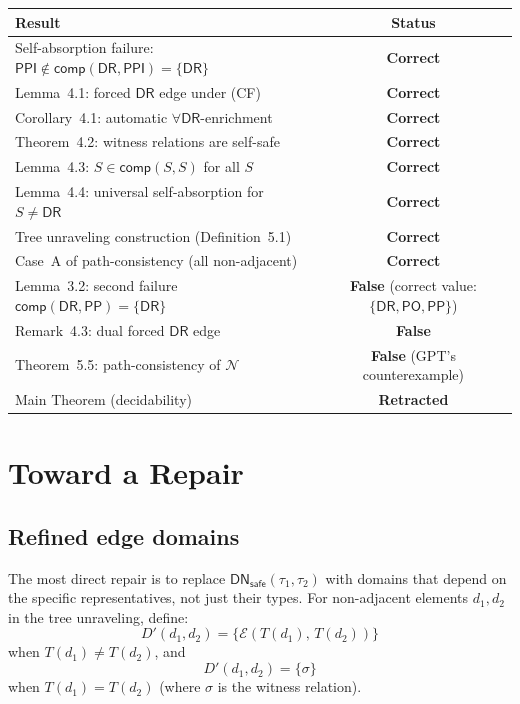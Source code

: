 \documentclass[a4paper,11pt]{article}
\theoremstyle{definition}
\newcommand{\DR}{\ensuremath{\mathsf{DR}}}
\newcommand{\PO}{\ensuremath{\mathsf{PO}}}
\newcommand{\PP}{\ensuremath{\mathsf{PP}}}
\newcommand{\PPI}{\ensuremath{\mathsf{PPI}}}
\newcommand{\comp}{\ensuremath{\mathsf{comp}}}
\newcommand{\DNsafe}{\ensuremath{\mathsf{DN}_{\mathsf{safe}}}}
\begin{document}
\begin{center}
\renewcommand{\arraystretch}{1.25}
\begin{tabular}{@{}lc@{}}
\toprule
\textbf{Result} & \textbf{Status} \\
\midrule
Self-absorption failure: $\PPI \notin \comp(\DR,\PPI) = \{\DR\}$
  & \textbf{Correct} \\
Lemma~4.1: forced $\DR$ edge under (CF)
  & \textbf{Correct} \\
Corollary~4.1: automatic $\forall\DR$-enrichment
  & \textbf{Correct} \\
Theorem~4.2: witness relations are self-safe
  & \textbf{Correct} \\
Lemma~4.3: $S \in \comp(S,S)$ for all $S$
  & \textbf{Correct} \\
Lemma~4.4: universal self-absorption for $S \neq \DR$
  & \textbf{Correct} \\
Tree unraveling construction (Definition~5.1)
  & \textbf{Correct} \\
Case~A of path-consistency (all non-adjacent)
  & \textbf{Correct} \\
\midrule
Lemma~3.2: second failure $\comp(\DR,\PP) = \{\DR\}$
  & \textbf{False} (correct value: $\{\DR,\PO,\PP\}$) \\
Remark~4.3: dual forced $\DR$ edge
  & \textbf{False} \\
Theorem~5.5: path-consistency of $\mathcal{N}$
  & \textbf{False} (GPT's counterexample) \\
Main Theorem (decidability)
  & \textbf{Retracted} \\
\bottomrule
\end{tabular}
\end{center}


\section{Toward a Repair}

\subsection{Refined edge domains}

The most direct repair is to replace $\DNsafe(\tau_1, \tau_2)$ with
domains that depend on the specific representatives, not just their
types.  For non-adjacent elements $d_1, d_2$ in the tree unraveling,
define:
\[
  D'(d_1, d_2) = \{ \mathcal{E}(T(d_1),\, T(d_2)) \}
\]
when $T(d_1) \neq T(d_2)$, and
\[
  D'(d_1, d_2) = \{ \sigma \}
\]
when $T(d_1) = T(d_2)$ (where $\sigma$ is the witness relation).
\end{document}
